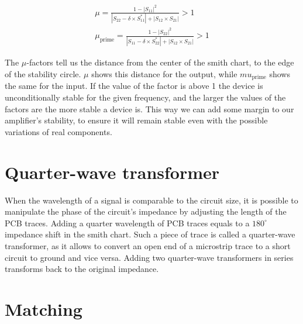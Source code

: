 \begin{gather}
	\mu=\frac{1-|S_{11}|^2}{|S_{22}-\delta \times S_{11}^*|+|S_{12}\times S_{21}|}>1 \\
	\mu_\text{prime}=\frac{1-|S_{22}|^2}{|S_{11}-\delta \times S_{22}^*|+|S_{12}\times S_{21}|}>1
\end{gather}

The $\mu$-factors tell us the distance from the center of the smith chart, to the edge of the stability circle. $\mu$ shows this distance for the output, while $mu_\text{prime}$ shows the same for the input. If the value of the factor is above 1 the device is unconditionally stable for the given frequency, and the larger the values of the factors are the more stable a device is. This way we can add some margin to our amplifier's stability, to ensure it will remain stable even with the possible variations of real components.

\section{Quarter-wave transformer}

When the wavelength of a signal is comparable to the circuit size, it is possible to manipulate the phase of the circuit's impedance by adjusting the length of the PCB traces. Adding a quarter wavelength of PCB traces equals to a $180^\circ$ impedance shift in the smith chart. Such a piece of trace is called a quarter-wave transformer, as it allows to convert an open end of a microstrip trace to a short circuit to ground and vice versa. Adding two quarter-wave transformers in series transforms back to the original impedance. %

\section{Matching}

